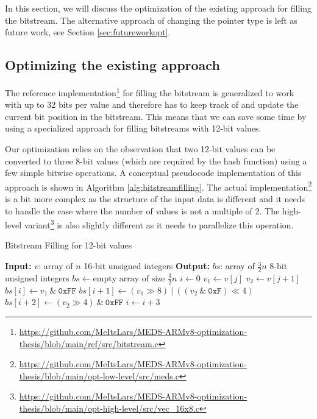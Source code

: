 \documentclass[11pt,a4paper]{report}
\theoremstyle{definition}
\begin{document}
In this section, we will discuss the optimization of the existing approach for filling the bitstream. The alternative approach of changing the pointer type is left as future work, see Section \ref{sec:futureworkopt}.

\subsection{Optimizing the existing approach}
The reference implementation\footnote{\url{https://github.com/MeItsLars/MEDS-ARMv8-optimization-thesis/blob/main/ref/src/bitstream.c}} for filling the bitstream is generalized to work with up to 32 bits per value and therefore has to keep track of and update the current bit position in the bitstream. This means that we can save some time by using a specialized approach for filling bitstreams with 12-bit values.

Our optimization relies on the observation that two 12-bit values can be converted to three 8-bit values (which are required by the hash function) using a few simple bitwise operations. A conceptual pseudocode implementation of this approach is shown in Algorithm \ref{alg:bitstreamfilling}. The actual implementation\footnote{\url{https://github.com/MeItsLars/MEDS-ARMv8-optimization-thesis/blob/main/opt-low-level/src/meds.c}} is a bit more complex as the structure of the input data is different and it needs to handle the case where the number of values is not a multiple of 2. The high-level variant\footnote{\url{https://github.com/MeItsLars/MEDS-ARMv8-optimization-thesis/blob/main/opt-high-level/src/vec\_16x8.c}} is also slightly different as it needs to parallelize this operation.

\begin{algorithm}
  \label{alg:bitstreamfilling}
  \caption{Bitstream Filling for 12-bit values}
  \begin{algorithmic}
    \State \textbf{Input:} $v$: array of $n$ 16-bit unsigned integers
    \State \textbf{Output:} $bs$: array of $\frac{3}{2}n$ 8-bit unsigned integers
    \State $bs \gets \text{empty array of size } \frac{3}{2}n$
    \State $i \gets 0$
      \State $v_1 \gets v[j]$
      \State $v_2 \gets v[j + 1]$
      \State $bs[i] \gets v_1 ~\&~ \texttt{0xFF}$
      \State $bs[i + 1] \gets (v_1 \gg 8) ~|~ ((v_2 ~\&~ \texttt{0xF}) \ll 4)$
      \State $bs[i + 2] \gets (v_2 \gg 4) ~\&~ \texttt{0xFF}$
      \State $i \gets i + 3$
    \EndFor
  \end{algorithmic}
\end{algorithm}
\end{document}
